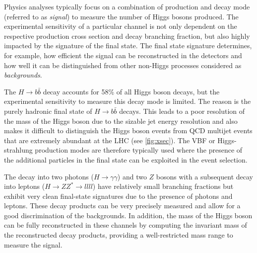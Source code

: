 Physics analyses typically focus on a combination of production and decay mode (referred to as \emph{signal}) to measure the number of Higgs bosons produced. The experimental sensitivity of a particular channel is not only dependent on the respective production cross section and decay branching fraction, but also highly impacted by the signature of the final state. The final state signature determines, for example, how efficient the signal can be reconstructed in the detectors and how well it can be distinguished from other non-Higgs processes considered as \emph{backgrounds}. 

The $H\rightarrow b\bar{b}$ decay accounts for 58\% of all Higgs boson decays, but the experimental sensitivity to measure this decay mode is limited. The reason is the purely hadronic final state of $H\rightarrow b\bar{b}$ decays. 
This leads to a poor resolution of the mass of the Higgs boson due to the sizable jet energy resolution and also makes it difficult to distinguish the Higgs boson events from QCD multijet events that are extremely abundant at the LHC (see \cref{fig:xsec}).
The VBF or Higgs-strahlung production modes are therefore typically used where the presence of the additional particles in the final state can be exploited in the event selection.

The decay into two photons ($H \to \gamma\gamma$) and two $Z$ bosons with a subsequent decay into leptons ($H \to ZZ^* \to llll$) have relatively small branching fractions but exhibit very clean final-state signatures due to the presence of photons and leptons. These decay products can be very precisely measured and allow for a good discrimination of the backgrounds.
In addition, the mass of the Higgs boson can be fully reconstructed in these channels by computing the invariant mass of the reconstructed decay products, providing a well-restricted mass range to measure the signal.

